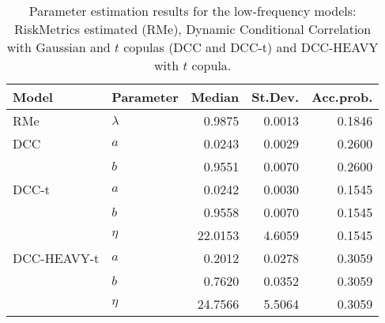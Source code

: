 \begin{table}[ht]
\centering
\caption{Parameter estimation results for the low-frequency models:
             RiskMetrics estimated (RMe), Dynamic Conditional Correlation
             with Gaussian and $t$ copulas (DCC and DCC-t) and DCC-HEAVY with $t$ copula.} 
\label{table:all_pars_lf_EX}
\begingroup\footnotesize
\begin{tabular}{llrrr}
  \hline
Model & Parameter & Median & St.Dev. & Acc.prob. \\ 
  \hline
RMe & $\lambda$ & 0.9875 & 0.0013 & 0.1846 \\ 
  DCC & $a$ & 0.0243 & 0.0029 & 0.2600 \\ 
   & $b$ & 0.9551 & 0.0070 & 0.2600 \\ 
  DCC-t & $a$ & 0.0242 & 0.0030 & 0.1545 \\ 
   & $b$ & 0.9558 & 0.0070 & 0.1545 \\ 
   & $\eta$ & 22.0153 & 4.6059 & 0.1545 \\ 
  DCC-HEAVY-t & $a$ & 0.2012 & 0.0278 & 0.3059 \\ 
   & $b$ & 0.7620 & 0.0352 & 0.3059 \\ 
   & $\eta$ & 24.7566 & 5.5064 & 0.3059 \\ 
   \hline
\end{tabular}
\endgroup
\end{table}
